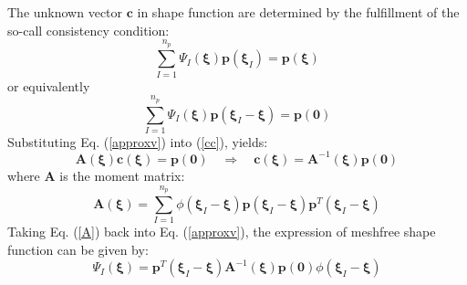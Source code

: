 The unknown vector $\boldsymbol c$ in shape function are determined by the fulfillment of the so-call consistency condition:
\begin{equation}
\sum_{I=1}^{n_p} \Psi_I(\boldsymbol \xi)\boldsymbol p(\boldsymbol \xi_I) = \boldsymbol p(\boldsymbol \xi)
\end{equation}
or equivalently
\begin{equation}\label{cc}
\sum_{I=1}^{n_p} \Psi_I(\boldsymbol \xi)\boldsymbol p(\boldsymbol \xi_I-\boldsymbol \xi) = \boldsymbol p(\boldsymbol 0)
\end{equation}
Substituting Eq. (\ref{approxv}) into (\ref{cc}), yields:
\begin{equation}\label{A}
\boldsymbol A(\boldsymbol \xi) \boldsymbol c(\boldsymbol \xi) = \boldsymbol p(\boldsymbol 0)\quad \Rightarrow \quad
\boldsymbol c(\boldsymbol \xi) = \boldsymbol A^{-1}(\boldsymbol \xi)\boldsymbol p(\boldsymbol 0)
\end{equation}
where $\boldsymbol A$ is the moment matrix:
\begin{equation}
\boldsymbol A(\boldsymbol \xi) = \sum_{I=1}^{n_p}\phi(\boldsymbol \xi_I - \boldsymbol \xi) \boldsymbol p(\boldsymbol \xi_I-\boldsymbol \xi)\boldsymbol p^T(\boldsymbol \xi_I - \boldsymbol \xi)
\end{equation}
Taking Eq. (\ref{A}) back into Eq. (\ref{approxv}), the expression of meshfree shape function can be given by:
\begin{equation}
\Psi_I(\boldsymbol \xi) = \boldsymbol p^T(\boldsymbol \xi_I - \boldsymbol \xi)\boldsymbol A^{-1}(\boldsymbol \xi) \boldsymbol p(\boldsymbol 0) \phi(\boldsymbol \xi_I-\boldsymbol \xi)
\end{equation}
